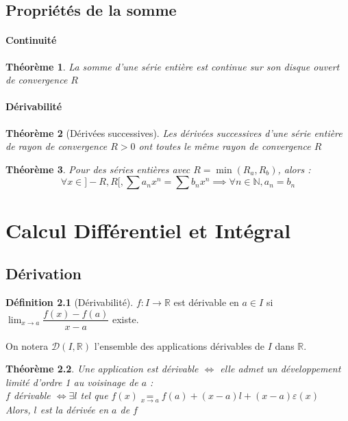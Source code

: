\documentclass[11pt,a4paper]{report}
\newtheorem{theorem}{Théorème}[chapter]
\theoremstyle{definition}
\newtheorem{dfn}[theorem]{Définition}
\begin{document}
\section{Propriétés de la somme}
\subsubsection*{Continuité}
\begin{theorem}
La somme d'une série entière est continue sur son disque ouvert de convergence $R$
\end{theorem}
\subsubsection*{Dérivabilité}
\begin{theorem}[Dérivées successives]
Les dérivées successives d'une série entière de rayon de convergence $R>0$ ont toutes le même rayon de convergence $R$
\end{theorem}
\begin{theorem}
Pour des séries entières avec $R = \min (R_a,R_b)$, alors : 
\[
\forall x \in ]-R,R[, \sum a_n x^n = \sum b_n x^n \implies \forall n \in \mathbb{N}, a_n = b_n
\]
\end{theorem}

\chapter{Calcul Différentiel et Intégral}
\section{Dérivation}
\begin{dfn}[Dérivabilité]
$f : I \to \ensuremath{\mathbb{R}}$ est dérivable en $a \in I$ si $\lim_{x\to a} \dfrac{f(x) - f(a)}{x - a}$ existe.
\end{dfn}
On notera $\mathcal{D}(I,\ensuremath{\mathbb{R}} )$ l'ensemble des applications dérivables de $I$ dans \ensuremath{\mathbb{R}}.

\begin{theorem}
Une application est dérivable $\Longleftrightarrow$ elle admet un développement limité d'ordre 1 au voisinage de $a$ : \\
$f$ dérivable $\Leftrightarrow \exists l$ tel que $f(x) \underset{x\to a}{=} f(a) + (x-a)l + (x-a)\varepsilon (x)$\\
Alors, $l$ est la dérivée en $a$ de $f$
\end{theorem}
\end{document}
